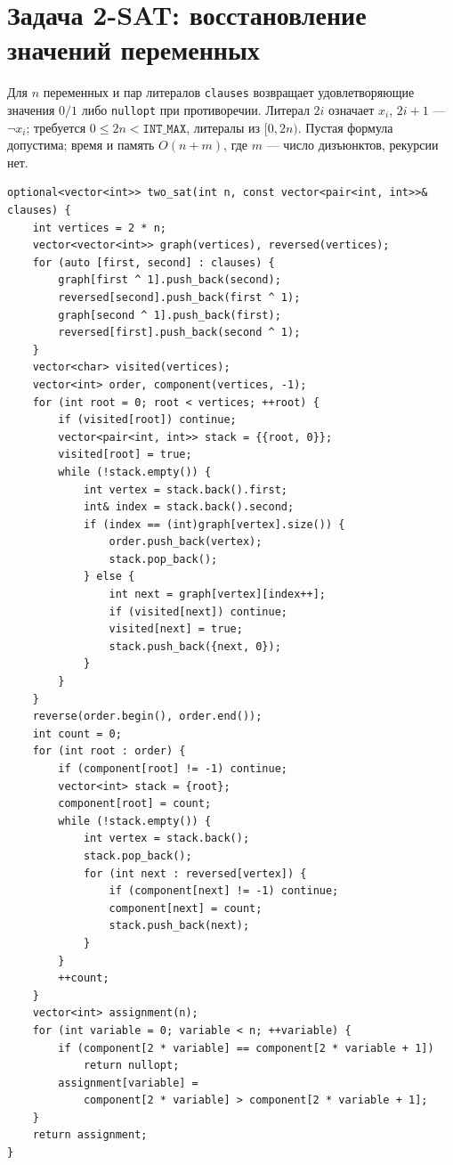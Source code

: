 \section{Задача 2-SAT: восстановление значений переменных}
Для $n$ переменных и пар литералов \texttt{clauses} возвращает удовлетворяющие значения $0/1$ либо \texttt{nullopt} при противоречии.
Литерал $2i$ означает $x_i$, $2i+1$ --- $\neg x_i$; требуется $0\le2n<\texttt{INT\_MAX}$, литералы из $[0,2n)$.
Пустая формула допустима; время и память $O(n+m)$, где $m$ --- число дизъюнктов, рекурсии нет.
\begin{lstlisting}[name=extra_graph_two_sat]
optional<vector<int>> two_sat(int n, const vector<pair<int, int>>& clauses) {
    int vertices = 2 * n;
    vector<vector<int>> graph(vertices), reversed(vertices);
    for (auto [first, second] : clauses) {
        graph[first ^ 1].push_back(second);
        reversed[second].push_back(first ^ 1);
        graph[second ^ 1].push_back(first);
        reversed[first].push_back(second ^ 1);
    }
    vector<char> visited(vertices);
    vector<int> order, component(vertices, -1);
    for (int root = 0; root < vertices; ++root) {
        if (visited[root]) continue;
        vector<pair<int, int>> stack = {{root, 0}};
        visited[root] = true;
        while (!stack.empty()) {
            int vertex = stack.back().first;
            int& index = stack.back().second;
            if (index == (int)graph[vertex].size()) {
                order.push_back(vertex);
                stack.pop_back();
            } else {
                int next = graph[vertex][index++];
                if (visited[next]) continue;
                visited[next] = true;
                stack.push_back({next, 0});
            }
        }
    }
    reverse(order.begin(), order.end());
    int count = 0;
    for (int root : order) {
        if (component[root] != -1) continue;
        vector<int> stack = {root};
        component[root] = count;
        while (!stack.empty()) {
            int vertex = stack.back();
            stack.pop_back();
            for (int next : reversed[vertex]) {
                if (component[next] != -1) continue;
                component[next] = count;
                stack.push_back(next);
            }
        }
        ++count;
    }
    vector<int> assignment(n);
    for (int variable = 0; variable < n; ++variable) {
        if (component[2 * variable] == component[2 * variable + 1])
            return nullopt;
        assignment[variable] =
            component[2 * variable] > component[2 * variable + 1];
    }
    return assignment;
}
\end{lstlisting}
